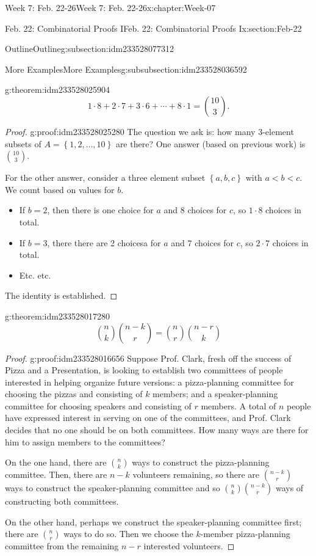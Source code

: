 \documentclass[oneside,10pt,]{book}
\numberwithin{equation}{section}
\newcommand{\set}[1]{\left\{ {#1} \right\}}
\newcommand{\lt}{<}
\begin{document}
\begin{chapterptx}{Week 7: Feb. 22-26}{}{Week 7: Feb. 22-26}{}{}{x:chapter:Week-07}
\begin{sectionptx}{Feb. 22: Combinatorial Proofs I}{}{Feb. 22: Combinatorial Proofs I}{}{}{x:section:Feb-22}
\begin{subsectionptx}{Outline}{}{Outline}{}{}{g:subsection:idm233528077312}
\begin{subsubsectionptx}{More Examples}{}{More Examples}{}{}{g:subsubsection:idm233528036592}
\begin{theorem}{}{}{g:theorem:idm233528025904}
\begin{equation*}
1\cdot 8 + 2\cdot 7 + 3\cdot 6 + \cdots + 8\cdot 1 = \binom{10}{3}.
\end{equation*}
\end{theorem}
\begin{proof}{}{g:proof:idm233528025280}
The question we ask is: how many 3-element subsets of \(A= \set{1,2,\ldots, 10}\) are there? One answer (based on previous work) is \(\binom{10}{3}\).%
\par
For the other answer, consider a three element subset \(\set{a,b,c}\) with \(a \lt b \lt c\). We count based on values for \(b\).%
%
\begin{itemize}[label=\textbullet]
\item{}If \(b=2\), then there is one choice for \(a\) and 8 choices for \(c\), so \(1\cdot 8\) choices in total.%
\item{}If \(b=3\), there there are 2 choicesa for \(a\) and \(7\) choices for \(c\), so \(2\cdot 7\) choices in total.%
\item{}Etc. etc.%
\end{itemize}
The identity is established.%
\end{proof}
\begin{theorem}{}{}{g:theorem:idm233528017280}%
%
\begin{equation*}
\binom{n}{k} \binom{n-k}{r} = \binom{n}{r} \binom{n-r}{k}
\end{equation*}
\end{theorem}
\begin{proof}{}{g:proof:idm233528016656}
Suppose Prof. Clark, fresh off the success of Pizza and a Presentation, is looking to establish two committees of people interested in helping organize future versions: a pizza-planning committee for choosing the pizzas and consisting of \(k\) members; and a speaker-planning committee for choosing speakers and consisting of \(r\) members. A total of \(n\) people have expressed interest in serving on one of the committees, and Prof. Clark decides that no one should be on both committees. How many ways are there for him to assign members to the committees?%
\par
On the one hand, there are \(\binom{n}{k}\) ways to construct the pizza-planning committee. Then, there are \(n-k\) volunteers remaining, so there are \(\binom{n-k}{r}\) ways to construct the speaker-planning committee and so \(\binom{n}{k} \binom{n-k}{r}\) ways of constructing both committees.%
\par
On the other hand, perhaps we construct the speaker-planning committee first; there are \(\binom{n}{r}\) ways to do so. Then we choose the \(k\)-member pizza-planning committee from the remaining \(n-r\) interested volunteers.%

\end{proof}
\end{subsubsectionptx}
\end{subsectionptx}
\end{sectionptx}
\end{chapterptx}
\end{document}
